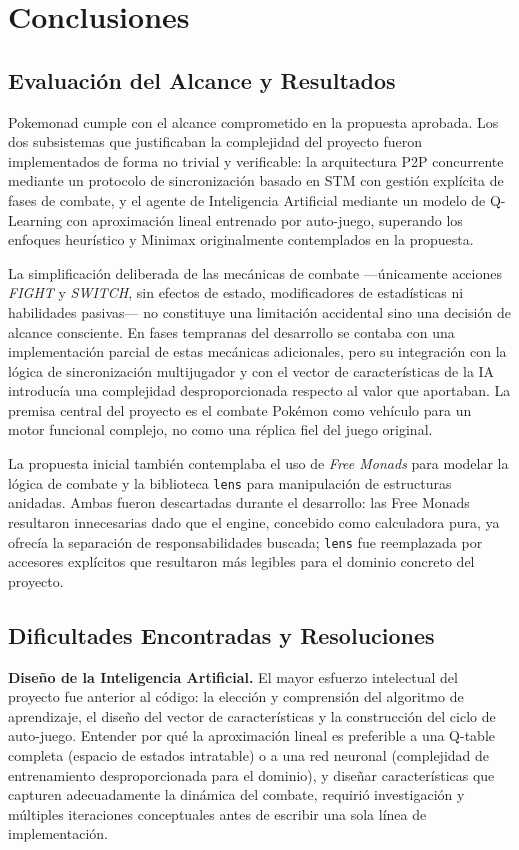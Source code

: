 \section{Conclusiones}

\subsection{Evaluación del Alcance y Resultados}

Pokemonad cumple con el alcance comprometido en la propuesta aprobada. Los dos subsistemas que justificaban la complejidad del proyecto fueron implementados de forma no trivial y verificable: la arquitectura P2P concurrente mediante un protocolo de sincronización basado en STM con gestión explícita de fases de combate, y el agente de Inteligencia Artificial mediante un modelo de Q-Learning con aproximación lineal entrenado por auto-juego, superando los enfoques heurístico y Minimax originalmente contemplados en la propuesta.

La simplificación deliberada de las mecánicas de combate —únicamente acciones \textit{FIGHT} y \textit{SWITCH}, sin efectos de estado, modificadores de estadísticas ni habilidades pasivas— no constituye una limitación accidental sino una decisión de alcance consciente. En fases tempranas del desarrollo se contaba con una implementación parcial de estas mecánicas adicionales, pero su integración con la lógica de sincronización multijugador y con el vector de características de la IA introducía una complejidad desproporcionada respecto al valor que aportaban. La premisa central del proyecto es el combate Pokémon como vehículo para un motor funcional complejo, no como una réplica fiel del juego original.

La propuesta inicial también contemplaba el uso de \textit{Free Monads} para modelar la lógica de combate y la biblioteca \texttt{lens} para manipulación de estructuras anidadas. Ambas fueron descartadas durante el desarrollo: las Free Monads resultaron innecesarias dado que el engine, concebido como calculadora pura, ya ofrecía la separación de responsabilidades buscada; \texttt{lens} fue reemplazada por accesores explícitos que resultaron más legibles para el dominio concreto del proyecto.

\subsection{Dificultades Encontradas y Resoluciones}

\textbf{Diseño de la Inteligencia Artificial.} El mayor esfuerzo intelectual del proyecto fue anterior al código: la elección y comprensión del algoritmo de aprendizaje, el diseño del vector de características y la construcción del ciclo de auto-juego. Entender por qué la aproximación lineal es preferible a una Q-table completa (espacio de estados intratable) o a una red neuronal (complejidad de entrenamiento desproporcionada para el dominio), y diseñar características que capturen adecuadamente la dinámica del combate, requirió investigación y múltiples iteraciones conceptuales antes de escribir una sola línea de implementación.

